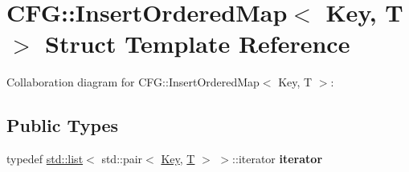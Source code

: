 \hypertarget{struct_c_f_g_1_1_insert_ordered_map}{}\section{C\+FG\+:\+:Insert\+Ordered\+Map$<$ Key, T $>$ Struct Template Reference}
\label{struct_c_f_g_1_1_insert_ordered_map}


Collaboration diagram for C\+FG\+:\+:Insert\+Ordered\+Map$<$ Key, T $>$\+:
\subsection*{Public Types}
\begin{DoxyCompactItemize}
\item 
\mbox{\label{struct_c_f_g_1_1_insert_ordered_map_a46b4cdc5283a86d273dc179977032f83}} 
typedef \mbox{\hyperlink{classstd_1_1list}{std\+::list}}$<$ std\+::pair$<$ \mbox{\hyperlink{struct_key}{Key}}, \mbox{\hyperlink{struct_t}{T}} $>$ $>$\+::iterator {\bfseries iterator}
\end{DoxyCompactItemize}
